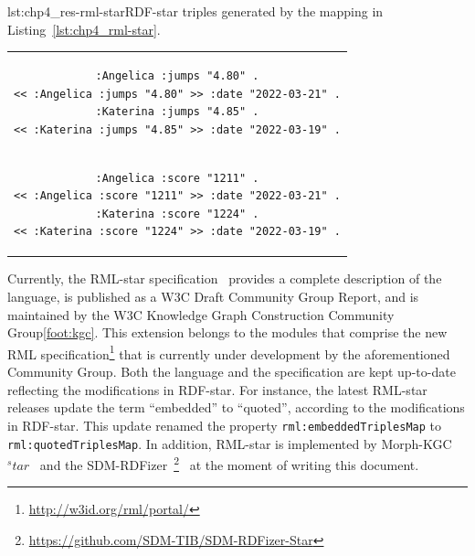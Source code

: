 \noindent\hspace{0.1\linewidth}\begin{minipage}{\linewidth}
\begin{captionedlisting}{lst:chp4_res-rml-star}{RDF-star triples generated by the mapping in Listing~\ref{lst:chp4_rml-star}.}
\centering
\begin{tabular}{c}
\hspace{2em}
{\begin{lstlisting}[basicstyle=\ttfamily\small,label={list:example1},columns=flexible]
:Angelica :jumps "4.80" .
<< :Angelica :jumps "4.80" >> :date "2022-03-21" .
:Katerina :jumps "4.85" .
<< :Katerina :jumps "4.85" >> :date "2022-03-19" .
\end{lstlisting}}\\
\hspace{2em}
{\begin{lstlisting}[basicstyle=\ttfamily\small,label={list:example1},columns=flexible,frame=l,rulecolor=\color{red},framerule=0.75pt,firstnumber=5]
:Angelica :score "1211" .
<< :Angelica :score "1211" >> :date "2022-03-21" .
:Katerina :score "1224" .
<< :Katerina :score "1224" >> :date "2022-03-19" .
\end{lstlisting}}

\end{tabular}
\end{captionedlisting}
\end{minipage}


Currently, the \mbox{RML-star} specification~\cite{iglesias2022rmlstar} provides a complete description of the language, is published as a W3C Draft Community Group Report, and is maintained by the W3C Knowledge Graph Construction Community Group\cref{foot:kgc}. 
This extension belongs to the modules that comprise the new RML specification\footnote{\label{foot:rml-portal}\url{http://w3id.org/rml/portal/}} that is currently under development by the aforementioned Community Group. 
Both the language and the specification are kept up-to-date reflecting the modifications in \mbox{RDF-star}.
For instance, the latest \mbox{RML-star} releases update the term ``embedded'' to ``quoted'',
according to the modifications in \mbox{RDF-star}.
This update renamed the property \texttt{rml:embeddedTriplesMap} to \texttt{rml:quotedTriplesMap}.
In addition, RML-star is implemented by Morph-KGC$^star$~\cite{arenas2023morphstar} and the SDM-RDFizer~\footnote{\url{https://github.com/SDM-TIB/SDM-RDFizer-Star}}~\cite{iglesias2020rdfizer} at the moment of writing this document.




